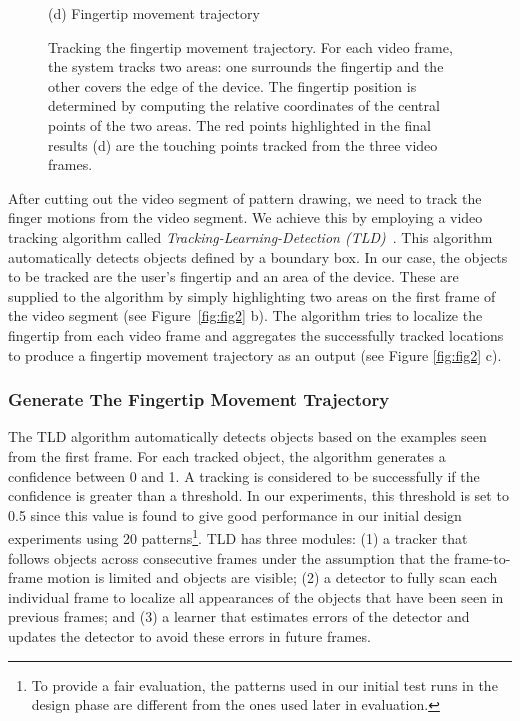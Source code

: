 \begin{figure}[!t]
{\begin{minipage}[t]{4.2cm}
                \centering \footnotesize (d) Fingertip movement trajectory
                \end{minipage}
            }
            \caption{Tracking the fingertip movement trajectory. For each video frame, the system tracks two areas: one surrounds the fingertip and the other covers the edge of the device.
            The fingertip position is determined by computing the relative coordinates of the central points of the two areas.
            The red points highlighted in the final results (d) are the touching points tracked from the three video frames.}
            \label{fig:fig5}
        \end{figure}

        After cutting out the video segment of pattern drawing, we need to track the finger motions from the video segment. We achieve this by employing a video tracking algorithm called
        \emph{Tracking-Learning-Detection (TLD)}~\cite{kalal2012tracking}. This
        algorithm automatically detects objects defined by a boundary box. In
        our case, the objects to be tracked are the user's fingertip and an area of the device.
        These are supplied to the algorithm by simply highlighting two areas on the first frame of the video segment (see Figure~\ref{fig:fig2} b). The
        algorithm tries to localize the fingertip from each video frame and aggregates the successfully tracked locations to produce a fingertip movement trajectory as an output (see Figure
        \ref{fig:fig2} c).

    \subsubsection{Generate The Fingertip Movement Trajectory}

        The TLD algorithm automatically detects
        objects based on the examples seen from the first frame.
        For each tracked object, the algorithm generates a confidence between 0 and 1.
        A tracking is considered to be successfully if the confidence is greater than a threshold.
        In our experiments, this threshold is set to 0.5 since this value is found to give good performance in our initial design experiments using 20 patterns\footnote{To provide a fair evaluation, the patterns used in
        our initial test runs in
        the design phase are different from the ones used later in evaluation.}.
        TLD has three modules: (1) a tracker that follows
        objects across consecutive frames under the assumption
        that the frame-to-frame motion is limited and objects are visible;
        (2) a detector to fully scan each individual frame to localize all
        appearances of the objects that have been seen in previous frames; and
        (3) a learner that estimates errors of the detector and updates the detector to avoid these errors in future
        frames.


